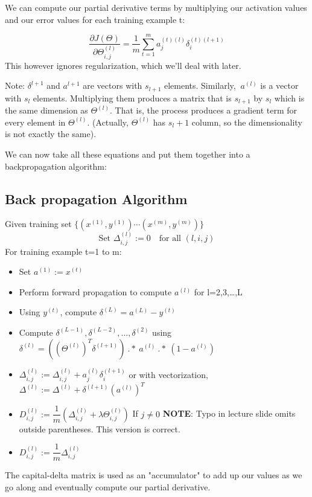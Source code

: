 We can compute our partial derivative terms by multiplying our activation values and our error values for each training example t:

$$\dfrac{\partial J(\Theta)}{\partial \Theta_{i,j}^{(l)}} = \frac{1}{m}\sum_{t=1}^m a_j^{(t)(l)} {\delta}_i^{(t)(l+1)} $$
This however ignores regularization, which we'll deal with later.

Note: $\delta^{l+1}$ and $a^{l+1}$ are vectors with $s_{l+1}$ elements. Similarly, $\ a^{(l)}$ is a vector with $s_l$ elements. Multiplying them produces a matrix that is $s_{l+1}$ by $s_l$ which is the same dimension as $\Theta^{(l)}$. That is, the process produces a gradient term for every element in $\Theta^{(l)}$. (Actually, $\Theta^{(l)}$ has $s_{l} + 1$ column, so the dimensionality is not exactly the same).

We can now take all these equations and put them together into a backpropagation algorithm:

\subsection{Back propagation Algorithm}
Given training set $\lbrace (x^{(1)}, y^{(1)}) \cdots (x^{(m)}, y^{(m)})\rbrace$
$$\text{Set } \Delta^{(l)}_{i,j} := 0\quad \text{for all } (l,i,j) $$
For training example t=1 to m:
\begin{itemize}
	\item Set $a^{(1)} := x^{(t)}$
	\item Perform forward propagation to compute $a^{(l)}$ for l=2,3,…,L
	\item Using $y^{(t)}$, compute $\delta^{(L)} = a^{(L)} - y^{(t)}$
	\item Compute $\delta^{(L-1)}, \delta^{(L-2)},\dots,\delta^{(2)}$ using $\delta^{(l)} = ((\Theta^{(l)})^T \delta^{(l+1)})\ .*\ a^{(l)}\ .*\ (1 - a^{(l)})$
	\item $\Delta^{(l)}_{i,j} := \Delta^{(l)}_{i,j} + a_j^{(l)} \delta_i^{(l+1)}$ or with vectorization,$ \Delta^{(l)} := \Delta^{(l)} + \delta^{(l+1)}(a^{(l)})^T$
	\item $ D^{(l)}_{i,j} := \dfrac{1}{m}\left(\Delta^{(l)}_{i,j} + \lambda\Theta^{(l)}_{i,j}\right)$ If $j \neq 0$ \textbf{NOTE}: Typo in lecture slide omits outside parentheses. This version is correct.
	\item $ D^{(l)}_{i,j} := \dfrac{1}{m}\Delta^{(l)}_{i,j}$
\end{itemize}
The capital-delta matrix is used as an "accumulator" to add up our values as we go along and eventually compute our partial derivative.

